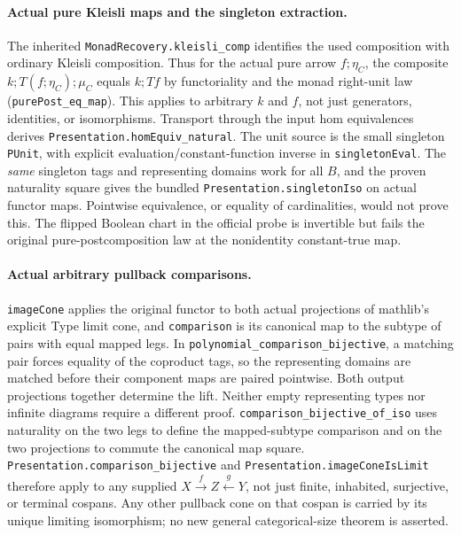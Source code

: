 \documentclass[11pt]{article}
\newcommand{\code}[1]{\texttt{#1}}
\begin{document}
\paragraph{Actual pure Kleisli maps and the singleton extraction.}
The inherited \code{MonadRecovery.kleisli\_comp} identifies the used composition with ordinary Kleisli composition. Thus for the actual pure arrow \(f\mathbin{;}\eta_C\), the composite \(k\mathbin{;}T(f\mathbin{;}\eta_C)\mathbin{;}\mu_C\) equals \(k\mathbin{;}T f\) by functoriality and the monad right-unit law (\code{purePost\_eq\_map}). This applies to arbitrary \(k\) and \(f\), not just generators, identities, or isomorphisms. Transport through the input hom equivalences derives \code{Presentation.homEquiv\_natural}. The unit source is the small singleton \code{PUnit}, with explicit evaluation/constant-function inverse in \code{singletonEval}. The \emph{same} singleton tags and representing domains work for all \(B\), and the proven naturality square gives the bundled \code{Presentation.singletonIso} on actual functor maps. Pointwise equivalence, or equality of cardinalities, would not prove this. The flipped Boolean chart in the official probe is invertible but fails the original pure-postcomposition law at the nonidentity constant-true map.

\paragraph{Actual arbitrary pullback comparisons.}
\code{imageCone} applies the original functor to both actual projections of mathlib's explicit Type limit cone, and \code{comparison} is its canonical map to the subtype of pairs with equal mapped legs. In \code{polynomial\_comparison\_bijective}, a matching pair forces equality of the coproduct tags, so the representing domains are matched before their component maps are paired pointwise. Both output projections together determine the lift. Neither empty representing types nor infinite diagrams require a different proof. \code{comparison\_bijective\_of\_iso} uses naturality on the two legs to define the mapped-subtype comparison and on the two projections to commute the canonical map square. \code{Presentation.comparison\_bijective} and \code{Presentation.imageConeIsLimit} therefore apply to any supplied \(X\xrightarrow f Z\xleftarrow g Y\), not just finite, inhabited, surjective, or terminal cospans. Any other pullback cone on that cospan is carried by its unique limiting isomorphism; no new general categorical-size theorem is asserted.
\end{document}
